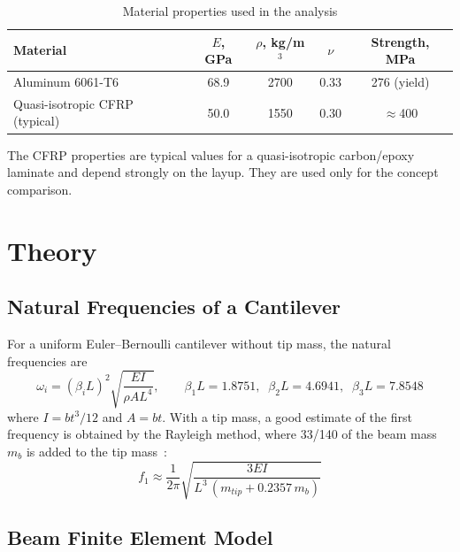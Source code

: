 \documentclass[letterpaper,10pt]{article}
\begin{document}
\begin{table}[H]
\centering
\caption{Material properties used in the analysis}
\label{tab:mat}
\begin{tabular}{lcccc}
\toprule
Material & $E$, GPa & $\rho$, kg/m$^3$ & $\nu$ & Strength, MPa \\
\midrule
Aluminum 6061-T6~\cite{asm} & 68.9 & 2700 & 0.33 & 276 (yield) \\
Quasi-isotropic CFRP (typical) & 50.0 & 1550 & 0.30 & $\approx$400 \\
\bottomrule
\end{tabular}
\end{table}

\noindent The CFRP properties are typical values for a quasi-isotropic carbon/epoxy
laminate and depend strongly on the layup. They are used only for the concept comparison.

\section{Theory}

\subsection{Natural Frequencies of a Cantilever}

For a uniform Euler--Bernoulli cantilever without tip mass, the natural frequencies
are~\cite{blevins,rao}
\begin{equation}
  \omega_i = (\beta_i L)^2 \sqrt{\frac{EI}{\rho A L^4}}, \qquad
  \beta_1 L = 1.8751,\;\; \beta_2 L = 4.6941,\;\; \beta_3 L = 7.8548
  \label{eq:exact}
\end{equation}
where $I = b t^3/12$ and $A = bt$. With a tip mass, a good estimate of the first
frequency is obtained by the Rayleigh method, where 33/140 of the beam mass $m_b$ is
added to the tip mass~\cite{blevins}:
\begin{equation}
  f_1 \approx \frac{1}{2\pi}\sqrt{\frac{3EI}{L^3\,(m_{tip} + 0.2357\,m_b)}}
  \label{eq:rayleigh}
\end{equation}

\subsection{Beam Finite Element Model}
\end{document}
